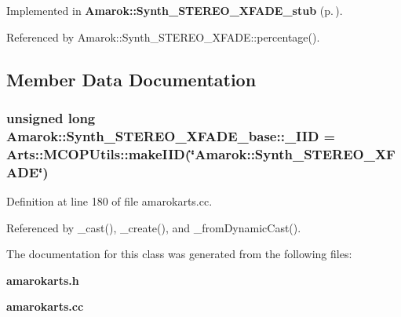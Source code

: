 Implemented in {\bf Amarok::Synth\_\-STEREO\_\-XFADE\_\-stub} {\rm (p.\,\pageref{classAmarok_1_1Synth__STEREO__XFADE__stub_Amarok_1_1Synth__STEREO__XFADE__stuba1})}.

Referenced by Amarok::Synth\_\-STEREO\_\-XFADE::percentage().

\subsection{Member Data Documentation}
\subsubsection{\setlength{\rightskip}{0pt plus 5cm}unsigned long {\bf Amarok::Synth\_\-STEREO\_\-XFADE\_\-base::\_\-IID} = Arts::MCOPUtils::make\-IID(\char`\"{}Amarok::Synth\_\-STEREO\_\-XFADE\char`\"{})\hspace{0.3cm}{\tt  [static]}}\label{classAmarok_1_1Synth__STEREO__XFADE__base_Amarok_1_1Synth__STEREO__XFADE__stubs0}




Definition at line 180 of file amarokarts.cc.

Referenced by \_\-cast(), \_\-create(), and \_\-from\-Dynamic\-Cast().

The documentation for this class was generated from the following files:\begin{CompactItemize}
\item 
{\bf amarokarts.h}\item 
{\bf amarokarts.cc}\end{CompactItemize}
